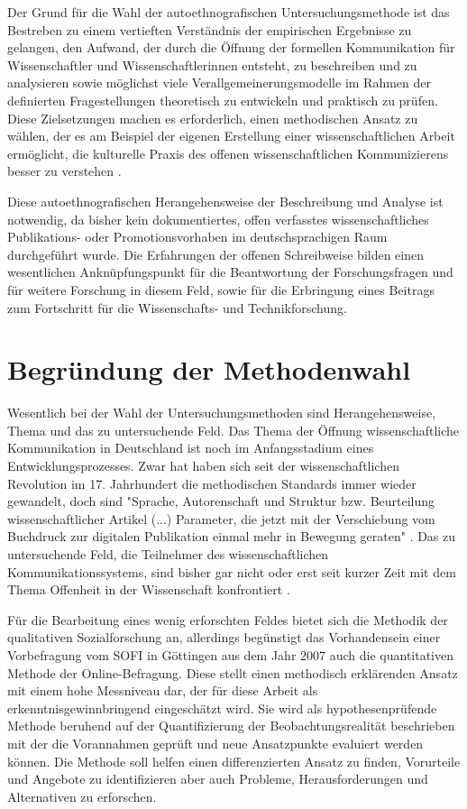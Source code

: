 Der Grund für die Wahl der autoethnografischen Untersuchungsmethode ist das Bestreben zu einem vertieften Verständnis der empirischen Ergebnisse zu gelangen, den Aufwand, der durch die Öffnung der formellen Kommunikation für Wissenschaftler und Wissenschaftlerinnen entsteht, zu beschreiben und zu analysieren sowie möglichst viele Verallgemeinerungsmodelle im Rahmen der definierten Fragestellungen theoretisch zu entwickeln und praktisch zu prüfen. Diese Zielsetzungen machen es erforderlich, einen methodischen Ansatz zu wählen, der es am Beispiel der eigenen Erstellung einer wissenschaftlichen Arbeit ermöglicht, die kulturelle Praxis des offenen wissenschaftlichen Kommunizierens besser zu verstehen \cite{maso_2001_phenomenology}.

Diese autoethnografischen Herangehensweise der Beschreibung und Analyse ist notwendig, da bisher kein dokumentiertes, offen verfasstes wissenschaftliches Publikations- oder Promotionsvorhaben im deutschsprachigen Raum durchgeführt wurde. Die Erfahrungen der offenen Schreibweise bilden einen wesentlichen Anknüpfungspunkt für die Beantwortung der Forschungsfragen und für weitere Forschung in diesem Feld, sowie für die Erbringung eines Beitrags zum Fortschritt für die Wissenschafts- und Technikforschung.

\section{Begründung der Methodenwahl}

Wesentlich bei der Wahl der Untersuchungsmethoden sind Herangehensweise, Thema und das zu untersuchende Feld. Das Thema der Öffnung wissenschaftliche Kommunikation in Deutschland ist noch im Anfangsstadium eines Entwicklungsprozesses. Zwar hat haben sich seit der wissenschaftlichen Revolution im 17. Jahrhundert die methodischen Standards immer wieder gewandelt, doch sind "Sprache, Autorenschaft und Struktur bzw. Beurteilung wissenschaftlicher Artikel (...) Parameter, die jetzt mit der Verschiebung vom Buchdruck zur digitalen Publikation einmal mehr in Bewegung geraten" \cite{hagner_2015_sache_buches}. Das zu untersuchende Feld, die Teilnehmer des wissenschaftlichen Kommunikationssystems, sind bisher gar nicht oder erst seit kurzer Zeit mit dem Thema Offenheit in der Wissenschaft konfrontiert \cite{hagner_2015_sache_buches}.

Für die Bearbeitung eines wenig erforschten Feldes bietet sich die Methodik der qualitativen Sozialforschung an, allerdings begünstigt das Vorhandensein einer Vorbefragung vom SOFI in Göttingen aus dem Jahr 2007 auch die quantitativen Methode der Online-Befragung. Diese stellt einen methodisch erklärenden Ansatz mit einem hohe Messniveau dar, der für diese Arbeit als erkenntnisgewinnbringend eingeschätzt wird. Sie wird als hypothesenprüfende Methode beruhend auf der Quantifizierung der Beobachtungsrealität beschrieben \cite{bortz_Doering_2006_Methoden} mit der die Vorannahmen geprüft und neue Ansatzpunkte evaluiert werden können. Die Methode soll helfen einen differenzierten Ansatz zu finden, Vorurteile und Angebote zu identifizieren aber auch Probleme, Herausforderungen und Alternativen zu erforschen.

